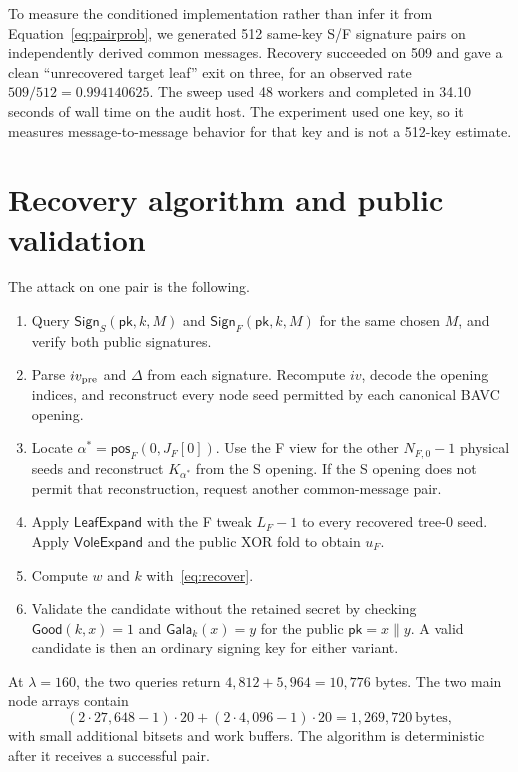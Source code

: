 \documentclass[11pt,a4paper]{article}
\newcommand{\Sign}{\mathsf{Sign}}
\newcommand{\pk}{\mathsf{pk}}
\newcommand{\LeafExpand}{\mathsf{LeafExpand}}
\newcommand{\VoleExpand}{\mathsf{VoleExpand}}
\newcommand{\pos}{\mathsf{pos}}
\newcommand{\Gala}{\mathsf{Gala}}
\newcommand{\Good}{\mathsf{Good}}
\begin{document}
To measure the conditioned implementation rather than infer it from
Equation~\eqref{eq:pairprob}, we generated 512 same-key S/F signature pairs on
independently derived common messages.  Recovery succeeded on 509 and gave a
clean ``unrecovered target leaf'' exit on three, for an observed rate
$509/512=0.994140625$.  The sweep used 48 workers and completed in 34.10 seconds
of wall time on the audit host.  The experiment used one key, so it measures
message-to-message behavior for that key and is not a 512-key estimate.

\section{Recovery algorithm and public validation}

The attack on one pair is the following.
\begin{enumerate}[leftmargin=*,itemsep=2pt]
  \item Query $\Sign_S(\pk,k,M)$ and $\Sign_F(\pk,k,M)$ for the same chosen
        $M$, and verify both public signatures.
  \item Parse $iv_{\rm pre}$ and $\Delta$ from each signature.  Recompute $iv$,
        decode the opening indices, and reconstruct every node seed permitted by
        each canonical BAVC opening.
  \item Locate $\alpha^*=\pos_F(0,J_F[0])$.  Use the F view for the other
        $N_{F,0}-1$ physical seeds and reconstruct $K_{\alpha^*}$ from the S
        opening.  If the S opening does not permit that reconstruction, request
        another common-message pair.
  \item Apply $\LeafExpand$ with the F tweak $L_F-1$ to every recovered
        tree-0 seed.  Apply $\VoleExpand$ and the public XOR fold to obtain $u_F$.
  \item Compute $w$ and $k$ with~\eqref{eq:recover}.
  \item Validate the candidate without the retained secret by checking
        $\Good(k,x)=1$ and $\Gala_k(x)=y$ for the public $\pk=x\mathbin\|y$.
        A valid candidate is then an ordinary signing key for either variant.
\end{enumerate}

At $\lambda=160$, the two queries return $4{,}812+5{,}964=10{,}776$ bytes.
The two main node arrays contain
\[
 (2\cdot27{,}648-1)\cdot20+(2\cdot4{,}096-1)\cdot20
   =1{,}269{,}720\ \text{bytes},
\]
with small additional bitsets and work buffers.  The algorithm is deterministic
after it receives a successful pair.
\end{document}
